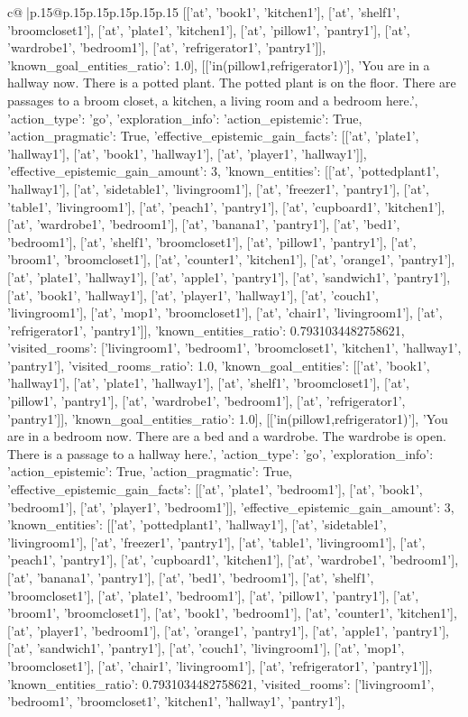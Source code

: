 \documentclass{article}
\begin{document}
{\begin{supertabular}{c@{$\;$}|p{.15\linewidth}@{}p{.15\linewidth}p{.15\linewidth}p{.15\linewidth}p{.15\linewidth}p{.15\linewidth}}
{{{[['at', 'book1', 'kitchen1'], ['at', 'shelf1', 'broomcloset1'], ['at', 'plate1', 'kitchen1'], ['at', 'pillow1', 'pantry1'], ['at', 'wardrobe1', 'bedroom1'], ['at', 'refrigerator1', 'pantry1']], 'known_goal_entities_ratio': 1.0}}], [['in(pillow1,refrigerator1)'], 'You are in a hallway now. There is a potted plant. The potted plant is on the floor. There are passages to a broom closet, a kitchen, a living room and a bedroom here.', {'action_type': 'go', 'exploration_info': {'action_epistemic': True, 'action_pragmatic': True, 'effective_epistemic_gain_facts': [['at', 'plate1', 'hallway1'], ['at', 'book1', 'hallway1'], ['at', 'player1', 'hallway1']], 'effective_epistemic_gain_amount': 3, 'known_entities': [['at', 'pottedplant1', 'hallway1'], ['at', 'sidetable1', 'livingroom1'], ['at', 'freezer1', 'pantry1'], ['at', 'table1', 'livingroom1'], ['at', 'peach1', 'pantry1'], ['at', 'cupboard1', 'kitchen1'], ['at', 'wardrobe1', 'bedroom1'], ['at', 'banana1', 'pantry1'], ['at', 'bed1', 'bedroom1'], ['at', 'shelf1', 'broomcloset1'], ['at', 'pillow1', 'pantry1'], ['at', 'broom1', 'broomcloset1'], ['at', 'counter1', 'kitchen1'], ['at', 'orange1', 'pantry1'], ['at', 'plate1', 'hallway1'], ['at', 'apple1', 'pantry1'], ['at', 'sandwich1', 'pantry1'], ['at', 'book1', 'hallway1'], ['at', 'player1', 'hallway1'], ['at', 'couch1', 'livingroom1'], ['at', 'mop1', 'broomcloset1'], ['at', 'chair1', 'livingroom1'], ['at', 'refrigerator1', 'pantry1']], 'known_entities_ratio': 0.7931034482758621, 'visited_rooms': ['livingroom1', 'bedroom1', 'broomcloset1', 'kitchen1', 'hallway1', 'pantry1'], 'visited_rooms_ratio': 1.0, 'known_goal_entities': [['at', 'book1', 'hallway1'], ['at', 'plate1', 'hallway1'], ['at', 'shelf1', 'broomcloset1'], ['at', 'pillow1', 'pantry1'], ['at', 'wardrobe1', 'bedroom1'], ['at', 'refrigerator1', 'pantry1']], 'known_goal_entities_ratio': 1.0}}], [['in(pillow1,refrigerator1)'], 'You are in a bedroom now. There are a bed and a wardrobe. The wardrobe is open. There is a passage to a hallway here.', {'action_type': 'go', 'exploration_info': {'action_epistemic': True, 'action_pragmatic': True, 'effective_epistemic_gain_facts': [['at', 'plate1', 'bedroom1'], ['at', 'book1', 'bedroom1'], ['at', 'player1', 'bedroom1']], 'effective_epistemic_gain_amount': 3, 'known_entities': [['at', 'pottedplant1', 'hallway1'], ['at', 'sidetable1', 'livingroom1'], ['at', 'freezer1', 'pantry1'], ['at', 'table1', 'livingroom1'], ['at', 'peach1', 'pantry1'], ['at', 'cupboard1', 'kitchen1'], ['at', 'wardrobe1', 'bedroom1'], ['at', 'banana1', 'pantry1'], ['at', 'bed1', 'bedroom1'], ['at', 'shelf1', 'broomcloset1'], ['at', 'plate1', 'bedroom1'], ['at', 'pillow1', 'pantry1'], ['at', 'broom1', 'broomcloset1'], ['at', 'book1', 'bedroom1'], ['at', 'counter1', 'kitchen1'], ['at', 'player1', 'bedroom1'], ['at', 'orange1', 'pantry1'], ['at', 'apple1', 'pantry1'], ['at', 'sandwich1', 'pantry1'], ['at', 'couch1', 'livingroom1'], ['at', 'mop1', 'broomcloset1'], ['at', 'chair1', 'livingroom1'], ['at', 'refrigerator1', 'pantry1']], 'known_entities_ratio': 0.7931034482758621, 'visited_rooms': ['livingroom1', 'bedroom1', 'broomcloset1', 'kitchen1', 'hallway1', 'pantry1'], }}}
\end{supertabular}}
\end{document}
